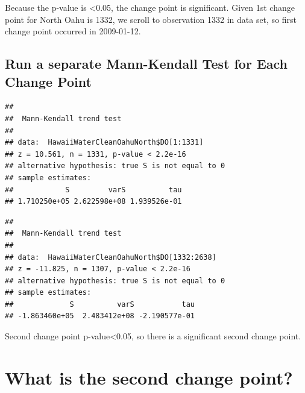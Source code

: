 \documentclass[12pt,]{article}
\newenvironment{Shaded}{\begin{snugshade}}{\end{snugshade}}
\newcommand{\KeywordTok}[1]{\textcolor[rgb]{0.13,0.29,0.53}{\textbf{#1}}}
\newcommand{\DecValTok}[1]{\textcolor[rgb]{0.00,0.00,0.81}{#1}}
\newcommand{\OperatorTok}[1]{\textcolor[rgb]{0.81,0.36,0.00}{\textbf{#1}}}
\newcommand{\NormalTok}[1]{#1}
\begin{document}
Because the p-value is \textless{}0.05, the change point is significant.
Given 1st change point for North Oahu is 1332, we scroll to observation
1332 in data set, so first change point occurred in 2009-01-12.

\subsection{Run a separate Mann-Kendall Test for Each Change
Point}\label{run-a-separate-mann-kendall-test-for-each-change-point}

\begin{Shaded}
\end{Shaded}

\begin{verbatim}
## 
##  Mann-Kendall trend test
## 
## data:  HawaiiWaterCleanOahuNorth$DO[1:1331]
## z = 10.561, n = 1331, p-value < 2.2e-16
## alternative hypothesis: true S is not equal to 0
## sample estimates:
##            S         varS          tau 
## 1.710250e+05 2.622598e+08 1.939526e-01
\end{verbatim}

\begin{Shaded}
\end{Shaded}

\begin{verbatim}
## 
##  Mann-Kendall trend test
## 
## data:  HawaiiWaterCleanOahuNorth$DO[1332:2638]
## z = -11.825, n = 1307, p-value < 2.2e-16
## alternative hypothesis: true S is not equal to 0
## sample estimates:
##             S          varS           tau 
## -1.863460e+05  2.483412e+08 -2.190577e-01
\end{verbatim}

Second change point p-value\textless{}0.05, so there is a significant
second change point.

\section{What is the second change
point?}\label{what-is-the-second-change-point}
\end{document}
